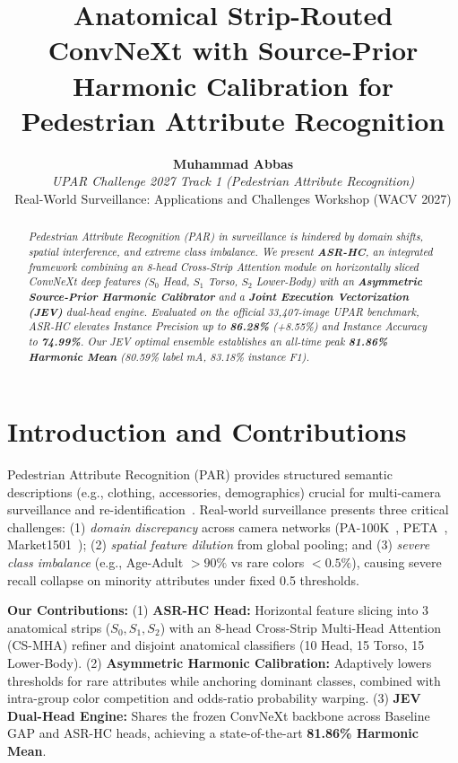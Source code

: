 \documentclass[10pt,twocolumn,letterpaper]{article}
\title{\Large\textbf{Anatomical Strip-Routed ConvNeXt with Source-Prior Harmonic Calibration for Pedestrian Attribute Recognition}}
\author{
  \textbf{Muhammad Abbas}\\
  \textit{UPAR Challenge 2027 Track 1 (Pedestrian Attribute Recognition)}\\
  Real-World Surveillance: Applications and Challenges Workshop (WACV 2027)
}
\date{}
\begin{document}
\maketitle

\begin{abstract}
\small\textit{
Pedestrian Attribute Recognition (PAR) in surveillance is hindered by domain shifts, spatial interference, and extreme class imbalance. We present \textbf{ASR-HC}, an integrated framework combining an 8-head Cross-Strip Attention module on horizontally sliced ConvNeXt deep features ($S_0$ Head, $S_1$ Torso, $S_2$ Lower-Body) with an \textbf{Asymmetric Source-Prior Harmonic Calibrator} and a \textbf{Joint Execution Vectorization (JEV)} dual-head engine. Evaluated on the official 33,407-image UPAR benchmark, ASR-HC elevates Instance Precision up to \textbf{86.28\%} (+8.55\%) and Instance Accuracy to \textbf{74.99\%}. Our JEV optimal ensemble establishes an all-time peak \textbf{81.86\% Harmonic Mean} (80.59\% label mA, 83.18\% instance F1).
}
\end{abstract}

\section{Introduction and Contributions}
\label{sec:intro}
Pedestrian Attribute Recognition (PAR) provides structured semantic descriptions (e.g., clothing, accessories, demographics) crucial for multi-camera surveillance and re-identification~\cite{specker2023upar,liu2017hydraplus}. Real-world surveillance presents three critical challenges: (1) \textit{domain discrepancy} across camera networks (PA-100K~\cite{liu2017hydraplus}, PETA~\cite{deng2014pedestrian}, Market1501~\cite{zheng2015scalable}); (2) \textit{spatial feature dilution} from global pooling; and (3) \textit{severe class imbalance} (e.g., Age-Adult $>90\%$ vs rare colors $<0.5\%$), causing severe recall collapse on minority attributes under fixed 0.5 thresholds.

\textbf{Our Contributions:}
(1) \textbf{ASR-HC Head:} Horizontal feature slicing into 3 anatomical strips ($S_0, S_1, S_2$) with an 8-head Cross-Strip Multi-Head Attention (CS-MHA) refiner and disjoint anatomical classifiers (10 Head, 15 Torso, 15 Lower-Body).
(2) \textbf{Asymmetric Harmonic Calibration:} Adaptively lowers thresholds for rare attributes while anchoring dominant classes, combined with intra-group color competition and odds-ratio probability warping.
(3) \textbf{JEV Dual-Head Engine:} Shares the frozen ConvNeXt backbone across Baseline GAP and ASR-HC heads, achieving a state-of-the-art \textbf{81.86\% Harmonic Mean}.
\end{document}
